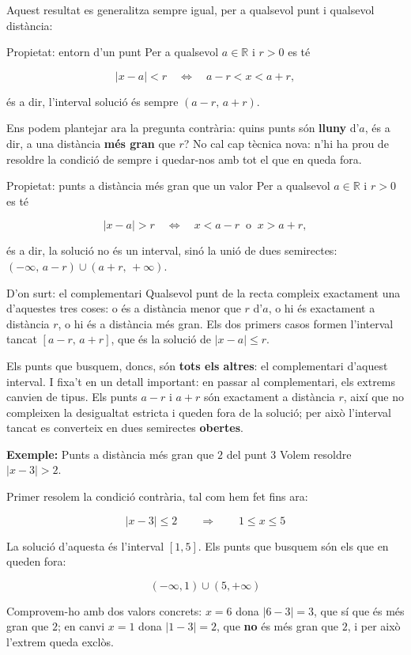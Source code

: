 Aquest resultat es generalitza sempre igual, per a qualsevol punt i qualsevol distància:

\begin{propietat}{Propietat: entorn d'un punt}
Per a qualsevol $a \in \mathbb{R}$ i $r>0$ es té

\[
|x-a| < r \quad \Longleftrightarrow \quad a-r < x < a+r,
\]

és a dir, l'interval solució és sempre $(a-r,\,a+r)$.
\end{propietat}

Ens podem plantejar ara la pregunta contrària: quins punts són \textbf{lluny} d'$a$, és a dir, a una distància \textbf{més gran} que $r$? No cal cap tècnica nova: n'hi ha prou de resoldre la condició de sempre i quedar-nos amb tot el que en queda fora.

\begin{propietat}{Propietat: punts a distància més gran que un valor}
Per a qualsevol $a \in \mathbb{R}$ i $r>0$ es té

\[
|x-a| > r \quad \Longleftrightarrow \quad x < a-r \ \text{ o } \ x > a+r,
\]

és a dir, la solució no és un interval, sinó la unió de dues semirectes: $(-\infty,\,a-r)\cup(a+r,\,+\infty)$.
\end{propietat}

\begin{nota}{D'on surt: el complementari}
Qualsevol punt de la recta compleix exactament una d'aquestes tres coses: o és a distància menor que $r$ d'$a$, o hi és exactament a distància $r$, o hi és a distància més gran. Els dos primers casos formen l'interval tancat $[a-r,\,a+r]$, que és la solució de $|x-a|\leq r$.

Els punts que busquem, doncs, són \textbf{tots els altres}: el complementari d'aquest interval. I fixa't en un detall important: en passar al complementari, els extrems canvien de tipus. Els punts $a-r$ i $a+r$ són exactament a distància $r$, així que no compleixen la desigualtat estricta i queden fora de la solució; per això l'interval tancat es converteix en dues semirectes \textbf{obertes}.
\end{nota}

\begin{exemple}{\textbf{Exemple:} Punts a distància més gran que $2$ del punt $3$}
Volem resoldre $|x-3|>2$.

Primer resolem la condició contrària, tal com hem fet fins ara:

\[
|x-3|\leq 2 \qquad\Rightarrow\qquad 1 \leq x \leq 5
\]

La solució d'aquesta és l'interval $[1,5]$. Els punts que busquem són els que en queden fora:

\[
(-\infty,1)\cup(5,+\infty)
\]

Comprovem-ho amb dos valors concrets: $x=6$ dona $|6-3|=3$, que sí que és més gran que $2$; en canvi $x=1$ dona $|1-3|=2$, que \textbf{no} és més gran que $2$, i per això l'extrem queda exclòs.
\end{exemple}

